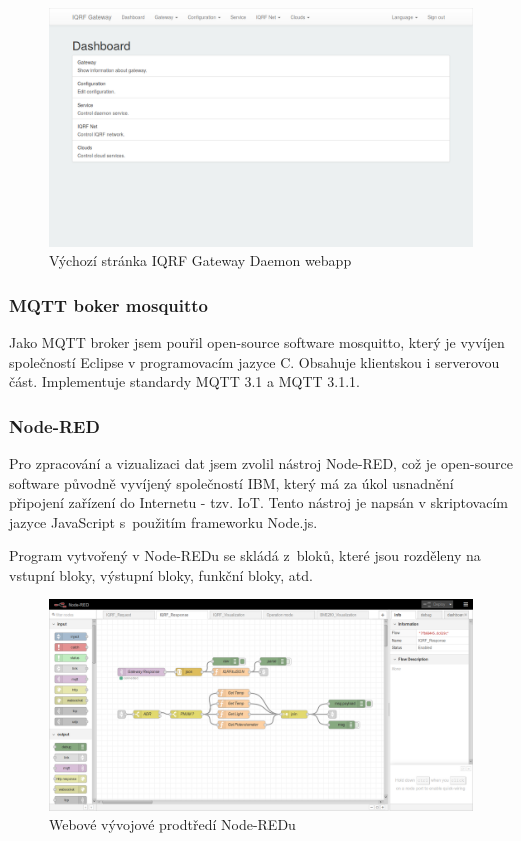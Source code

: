 \documentclass[12pt,a4paper]{article}
\begin{document}
\begin{figure}[H]
\centering
\label{fig:iqrf/iqrf-daemon-webapp}
\includegraphics[width = 150mm]{img/iqrf/iqrf-daemon-webapp.png}
\caption{Výchozí stránka IQRF Gateway Daemon webapp}
\end{figure}

\subsubsection{MQTT boker mosquitto}

Jako MQTT broker jsem pouřil open-source software mosquitto\cite{sw/mosquitto}, který je vyvíjen společností Eclipse v programovacím jazyce C. Obsahuje klientskou i serverovou část. Implementuje standardy MQTT 3.1 a MQTT 3.1.1.

\newpage

\subsubsection{Node-RED}

Pro zpracování a vizualizaci dat jsem zvolil nástroj Node-RED\cite{sw/node-red}, což je open-source software původně vyvíjený společností IBM, který má za úkol usnadnění připojení zařízení do Internetu - tzv. IoT. Tento nástroj je napsán v skriptovacím jazyce JavaScript s~použitím frameworku Node.js.

Program vytvořený v Node-REDu se skládá z~bloků, které jsou rozděleny na vstupní bloky, výstupní bloky, funkční bloky, atd.

\begin{figure}[H]
\centering
\label{fig:node-red}
\includegraphics[width = 150mm]{img/node-red.png}
\caption{Webové vývojové prodtředí Node-REDu}
\end{figure}
\end{document}
